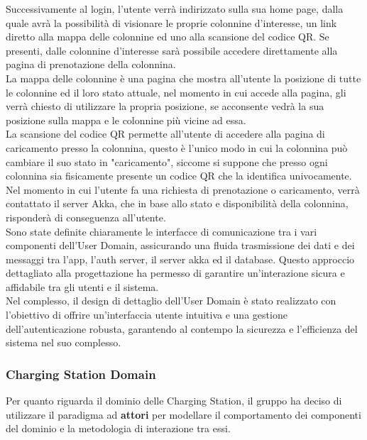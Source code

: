 Successivamente al login, l'utente verrà indirizzato sulla sua home page, dalla quale avrà la possibilità
di visionare le proprie colonnine d'interesse, un link diretto alla mappa delle colonnine ed uno
alla scansione del codice QR. Se presenti, dalle colonnine d'interesse sarà possibile accedere
direttamente alla pagina di prenotazione della colonnina.\\

La mappa delle colonnine è una pagina che mostra all'utente la posizione di tutte le colonnine ed il loro stato attuale,
nel momento in cui accede alla pagina, gli verrà chiesto di utilizzare la propria posizione,
se acconsente vedrà la sua posizione sulla mappa e le colonnine più vicine ad essa.\\

La scansione del codice QR permette all'utente di accedere alla pagina di caricamento presso la colonnina,
questo è l'unico modo in cui la colonnina può cambiare il suo stato in "caricamento", siccome si suppone che
presso ogni colonnina sia fisicamente presente un codice QR che la identifica univocamente.\\

Nel momento in cui l'utente fa una richiesta di prenotazione o caricamento, verrà contattato il server Akka,
che in base allo stato e disponibilità della colonnina, risponderà di conseguenza all'utente.\\

Sono state definite chiaramente le interfacce di comunicazione tra i vari componenti dell'User Domain,
assicurando una fluida trasmissione dei dati e dei messaggi tra l'app, l'auth server, il server akka ed il database.
Questo approccio dettagliato alla progettazione ha permesso di garantire un'interazione sicura e
affidabile tra gli utenti e il sistema.\\

Nel complesso, il design di dettaglio dell'User Domain è stato realizzato con l'obiettivo di offrire
un'interfaccia utente intuitiva e una gestione dell'autenticazione robusta, garantendo al contempo
la sicurezza e l'efficienza del sistema nel suo complesso.

\subsubsection{Charging Station Domain}
Per quanto riguarda il dominio delle Charging Station, il gruppo ha deciso di utilizzare il paradigma ad \textbf{attori} per modellare il comportamento dei componenti del dominio e la
metodologia di interazione tra essi. \\

